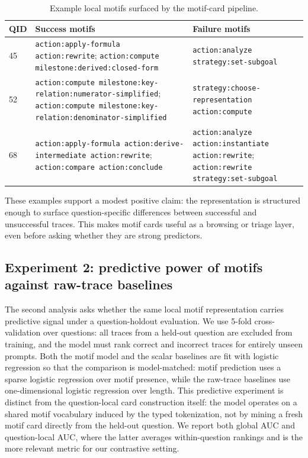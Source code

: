\documentclass[11pt]{article}
\newcommand{\tok}[1]{\texttt{\small #1}}
\begin{document}
\begin{table}[h]
\centering
\small
\caption{Example local motifs surfaced by the motif-card pipeline.}
\label{tab:examples}
\begin{tabular}{@{}p{8mm}p{45mm}p{45mm}@{}}
\toprule
QID & Success motifs & Failure motifs \\
\midrule
45 & \tok{action:apply-formula action:rewrite}; \tok{action:compute milestone:derived:closed-form} & \tok{action:analyze strategy:set-subgoal} \\
52 & \tok{action:compute milestone:key-relation:numerator-simplified}; \tok{action:compute milestone:key-relation:denominator-simplified} & \tok{strategy:choose-representation action:compute} \\
68 & \tok{action:apply-formula action:derive-intermediate action:rewrite}; \tok{action:compare action:conclude} & \tok{action:analyze action:instantiate action:rewrite}; \tok{action:rewrite strategy:set-subgoal} \\
\bottomrule
\end{tabular}
\end{table}

These examples support a modest positive claim: the representation is structured enough to surface question-specific differences between successful and unsuccessful traces. This makes motif cards useful as a browsing or triage layer, even before asking whether they are strong predictors.

\subsection{Experiment 2: predictive power of motifs against raw-trace baselines}

The second analysis asks whether the same local motif representation carries predictive signal under a question-holdout evaluation. We use 5-fold cross-validation over questions: all traces from a held-out question are excluded from training, and the model must rank correct and incorrect traces for entirely unseen prompts. Both the motif model and the scalar baselines are fit with logistic regression so that the comparison is model-matched: motif prediction uses a sparse logistic regression over motif presence, while the raw-trace baselines use one-dimensional logistic regression over length. This predictive experiment is distinct from the question-local card construction itself: the model operates on a shared motif vocabulary induced by the typed tokenization, not by mining a fresh motif card directly from the held-out question. We report both global AUC and question-local AUC, where the latter averages within-question rankings and is the more relevant metric for our contrastive setting.
\end{document}
